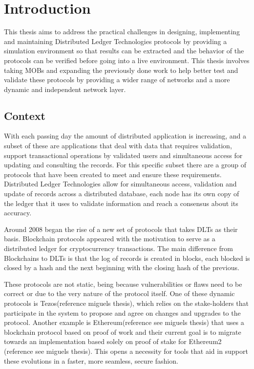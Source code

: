 
%

\chapter{Introduction}
\label{cha:introduction}

This thesis aims to address the practical challenges in designing, implementing and maintaining Distributed
Ledger Technologies protocols by providing a simulation environment so that results can be extracted and the behavior 
of the protocols can be verified before going into a live environment. This thesis involves taking MOBs and expanding
the previously done work to help better test and validate these protocols by providing a wider range of networks and
a more dynamic and independent network layer.


\section{Context}
\label{sub:context}
With each passing day the amount of distributed application is increasing, and a subset of these are applications that
deal with data that requires validation, support transactional operations by validated users and simultaneous access for updating and
consulting the records. For this specific subset there are a group of protocols that have been created to meet and ensure
these requirements. Distributed Ledger Technologies allow for simultaneous access, validation and update of records across
a distributed database, each node has its own copy of the ledger that it uses to validate information and reach a consensus
about its accuracy.

Around 2008 began the rise of a new set of protocols that takes DLTs as their basis. Blockchain protocols appeared with the motivation
to serve as a distributed ledger for cryptocurrency transactions. The main difference from Blockchains to DLTs is that
the log of records is created in blocks, each blocked is closed by a hash and the next beginning with the closing hash of the previous.

These protocols are not static, being because vulnerabilities or flaws need to be correct or due to the very nature of the protocol itself.
One of these dynamic protocols is Tezos(reference miguels thesis), which relies on the stake-holders that participate in the system to propose and
agree on changes and upgrades to the protocol. Another example is Ethereum(reference see miguels thesis) that uses a blockchain protocol based on proof
of work and their current goal is to migrate towards an implementation based solely on proof of stake for Ethereum2 (reference see miguels thesis).
This opens a necessity for tools that aid in support these evolutions in a faster, more seamless, secure fashion.

